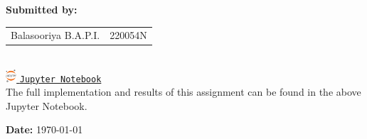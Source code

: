 \documentclass[12pt]{article}
\begin{document}
\begin{titlepage}
    \textbf{Submitted by:}\\
    \begin{tabular}{ll}
       Balasooriya B.A.P.I. & 220054N \\
    \end{tabular}\\[1cm]

    \noindent
    \href{https://github.com/PankajaBalasooriya/EN3150_Pattern_Recognition/blob/main/00_Assignments/A01_Learning_from_data_%26_Linear_Models/Assignment1.ipynb}{%
        \includegraphics[width=0.03\textwidth]{resources/jupyter-icon.png}\hspace{0.5em}%
        \texttt{Jupyter Notebook}%
    }\\[0.5em]
    \small The full implementation and results of this assignment can be found in the above Jupyter Notebook.

    \vfill
    
    \textbf{Date:} \today

    \vfill
\end{titlepage}

\newpage
\tableofcontents
\newpage



\end{document}

